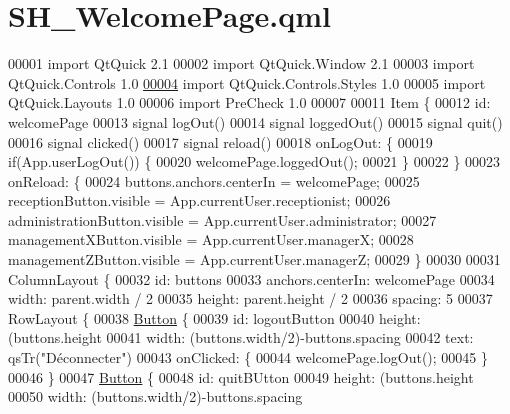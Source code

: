 \hypertarget{SH__WelcomePage_8qml}{\section{S\-H\-\_\-\-Welcome\-Page.\-qml}
\label{SH__WelcomePage_8qml}
}

\begin{DoxyCode}
00001 \textcolor{keyword}{import} QtQuick 2.1
00002 import QtQuick.Window 2.1
00003 import QtQuick.Controls 1.0
\hypertarget{SH__WelcomePage_8qml_source_l00004}{}\hyperlink{classSH__WelcomePage}{00004} import QtQuick.Controls.Styles 1.0
00005 import QtQuick.Layouts 1.0
00006 import PreCheck 1.0
00007 
00011 Item \{
00012     \textcolor{keywordtype}{id}: welcomePage
00013     signal logOut()
00014     signal loggedOut()
00015     signal quit()
00016     signal clicked()
00017     signal reload()
00018     onLogOut: \{
00019         \textcolor{keywordflow}{if}(App.userLogOut()) \{
00020             welcomePage.loggedOut();
00021         \}
00022     \}
00023     onReload: \{
00024         buttons.anchors.centerIn = welcomePage;
00025         receptionButton.visible = App.currentUser.receptionist;
00026         administrationButton.visible = App.currentUser.administrator;
00027         managementXButton.visible = App.currentUser.managerX;
00028         managementZButton.visible = App.currentUser.managerZ;
00029     \}
00030 
00031     ColumnLayout \{
00032         \textcolor{keywordtype}{id}: buttons
00033         anchors.centerIn: welcomePage
00034         width: parent.width / 2
00035         height: parent.height / 2
00036         spacing: 5
00037         RowLayout \{
00038             \hyperlink{classButton}{Button} \{
00039                 \textcolor{keywordtype}{id}: logoutButton
00040                 height: (buttons.height%
00041                 width: (buttons.width/2)-buttons.spacing
00042                 text: qsTr(\textcolor{stringliteral}{"Déconnecter"})
00043                 onClicked: \{
00044                     welcomePage.logOut();
00045                 \}
00046             \}
00047             \hyperlink{classButton}{Button} \{
00048                 \textcolor{keywordtype}{id}: quitBUtton
00049                 height: (buttons.height%
00050                 width: (buttons.width/2)-buttons.spacing

\end{DoxyCode}
